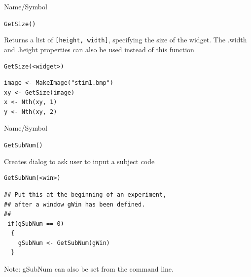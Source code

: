 \begin{desc}{Name/Symbol}
\item[Name/Symbol]	\verb+GetSize()+

\item[Description] Returns a list of \verb+[height, width]+,
  specifying the size of the widget.
  The .width and .height properties can also be used instead of this function

\item[Usage]
\begin{verbatim}
GetSize(<widget>)
\end{verbatim}

\item[Example]
\begin{verbatim}
image <- MakeImage("stim1.bmp")
xy <- GetSize(image)
x <- Nth(xy, 1)
y <- Nth(xy, 2)
\end{verbatim}

\item[See Also]	
\end{desc}

\begin{desc}{Name/Symbol}
\item[Name/Symbol]	\verb+GetSubNum()+

\item[Description]	Creates dialog to ask user to input a subject code

\item[Usage]
\begin{verbatim}
GetSubNum(<win>)
\end{verbatim}

\item[Example]

\begin{verbatim}
## Put this at the beginning of an experiment, 
## after a window gWin has been defined.
##
 if(gSubNum == 0)
  {
    gSubNum <- GetSubNum(gWin)
  }
\end{verbatim}
Note: gSubNum can also be set from the command line.
\item[See Also]
\end{desc}

